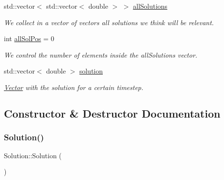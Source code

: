 \begin{DoxyCompactItemize}
\mbox{\label{class_solution_a09fa8d2538a87e8d9cba2ee682f729ac}} 
std\+::vector$<$ std\+::vector$<$ double $>$ $>$ \hyperlink{class_solution_a09fa8d2538a87e8d9cba2ee682f729ac}{all\+Solutions}
\begin{DoxyCompactList}\small\item\em We collect in a vector of vectors all solutions we think will be relevant. \end{DoxyCompactList}\item 
\mbox{\label{class_solution_af933662f6d08824b37f315fc36678c3b}} 
int \hyperlink{class_solution_af933662f6d08824b37f315fc36678c3b}{all\+Sol\+Pos} = 0
\begin{DoxyCompactList}\small\item\em We control the number of elements inside the all\+Solutions vector. \end{DoxyCompactList}\item 
\mbox{\label{class_solution_ae15c62e099b4ad8a337b62fd05283cd8}} 
std\+::vector$<$ double $>$ \hyperlink{class_solution_ae15c62e099b4ad8a337b62fd05283cd8}{solution}
\begin{DoxyCompactList}\small\item\em \hyperlink{class_vector}{Vector} with the solution for a certain timestep. \end{DoxyCompactList}\end{DoxyCompactItemize}


\subsection{Constructor \& Destructor Documentation}
\mbox{\label{class_solution_ab55bd4b023d596ce11aaf737b9a6123b}} 
\subsubsection{\texorpdfstring{Solution()}{Solution()}\hspace{0.1cm}{\footnotesize\ttfamily [1/2]}}
{\footnotesize\ttfamily Solution\+::\+Solution (\begin{DoxyParamCaption}{ }\end{DoxyParamCaption})}

